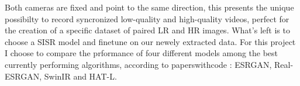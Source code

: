 Both cameras are fixed and point to the same direction, this presents the unique possibilty to record syncronized low-quality and high-quality videos, perfect for the creation of a specific dataset of paired LR and HR images. What's left is to choose a SISR model and finetune on our newely extracted data. For this project I choose to compare the prformance of four different models among the best currently performing algorithms, according to paperswithcode \cite{pwcode}: ESRGAN\cite{wang2018esrgan}, Real-ESRGAN\cite{wang2021realesrgan}, SwinIR\cite{liang2021swinir} and HAT-L\cite{chen2023activating}.
